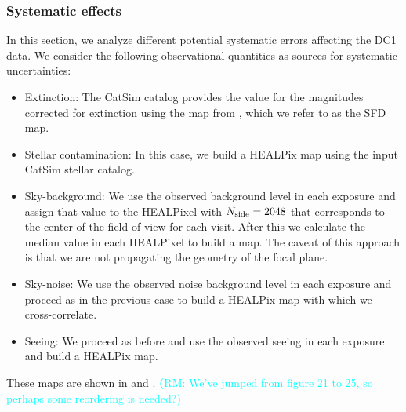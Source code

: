 \documentclass[twocolumn]{aastex62}
\newcommand{\rachel}[1]{{\textcolor{cyan}{{\textbf (RM: #1)}}}}
\begin{document}
\subsubsection{Systematic effects}
\label{ssec:systematics}
In this section, we analyze  different potential systematic errors affecting the DC1 data. We consider the following observational quantities as sources for systematic uncertainties:
\begin{itemize}
\item Extinction: The CatSim catalog provides the value for the magnitudes corrected for extinction using the map from \citet{1998ApJ...500..525S}, which we refer to as the SFD map.
\item Stellar contamination: In this case, we build a HEALPix map using the input CatSim stellar catalog.
\item Sky-background: We use the observed background level in each exposure and assign that value to the HEALPixel with $N_{\rm side}=2048$ that corresponds to the center of the field of view for each visit. After this we calculate the median value in each HEALPixel to build a map. The caveat of this approach is that we are not propagating the geometry of the focal plane.
\item Sky-noise: We use the observed noise background level in each exposure and proceed as in the previous case to build a HEALPix map with which we cross-correlate.
\item Seeing: We proceed as before and use the observed seeing in each exposure and build a HEALPix map.
\end{itemize}
These maps are shown in  and . \rachel{We've jumped from figure 21 to 25, so perhaps some reordering is needed?}
\end{document}
